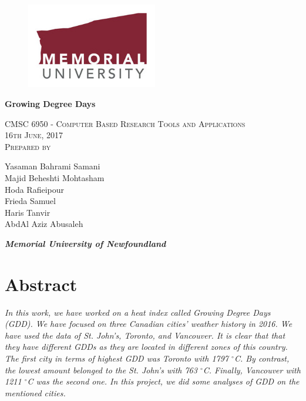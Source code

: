 \documentclass{article}
\begin{document}

\begin{figure}
\centering
\includegraphics[width=2.25in]{munlogo.jpg}
\end{figure}



{\centering


{\huge \bf Growing Degree Days}




\vspace{20mm} %
\scshape %
CMSC 6950 - Computer Based Research Tools and Applications \\ [\baselineskip]
16th June, 2017 \\[\baselineskip] 
\vspace{20mm} %
Prepared by \\[\baselineskip]
{\Large  Yasaman Bahrami Samani\\ Majid Beheshti Mohtasham \\Hoda Rafieipour  \\Frieda Samuel  \\Haris Tanvir  \\AbdAl Aziz Abusaleh  \\ \par}
\vfill
{\itshape \bf Memorial University of Newfoundland \par} 
}

\newpage

{\centering
  \section*{Abstract}
}

{\itshape In this work, we have worked on a heat index called Growing Degree Days (GDD). We have focused on three Canadian cities’ weather history in 2016. We have used the data of St. John's, Toronto, and Vancouver. It is clear that that they have different GDDs as they are located in different zones of this country. The first city in terms of highest GDD was Toronto with 1797  $^{\circ}$C. By contrast, the lowest amount belonged to the St. John's with 763  $^{\circ}$C. Finally, Vancouver with 1211  $^{\circ}$C was the second one. In this project, we did some analyses of GDD on the mentioned cities.\\
}
\end{document}
